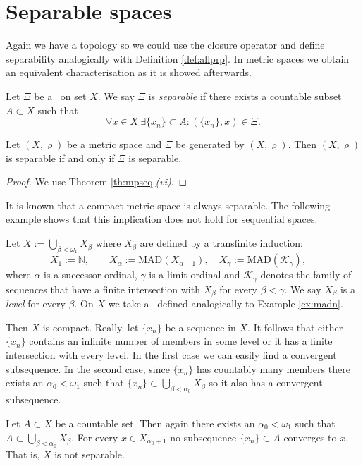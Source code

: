 \section{Separable spaces}

Again we have a topology so we could use the closure operator and define separability analogically with Definition \ref{def:allprp}. In metric spaces we obtain an equivalent characterisation as it is showed afterwards.

\begin{define}\label{def:sep}
Let $\Xi$ be a \fcs\ on set $X$. We say $\Xi$ is \emph{separable} if there exists a countable subset $A\subset X$ such that
\[
	\forall x\in X\ \exists\{x_n\}\subset A: (\{x_n\},x)\in \Xi.
\]
\end{define}

\begin{corollary} \label{th:conneq}
Let $(X,\varrho)$ be a metric space and $\Xi$ be generated by $(X,\varrho)$. Then $(X,\varrho)$ is separable if and only if $\Xi$ is separable.
\end{corollary}
\begin{proof}
We use Theorem \ref{th:mpseq}\emph{(vi)}.
\end{proof}

It is known that a compact metric space is always separable. The following example shows that this implication does not hold for sequential spaces.

\begin{example}\label{ex:madnw1}
Let $X:=\bigcup_{\beta<\omega_1}X_{\beta}$ where $X_\beta$ are defined by a transfinite induction:
\[
	X_1:=\mathbb{N}, \qquad
	X_\alpha:=\mathrm{MAD}(X_{\alpha-1}), \quad
	X_\gamma:=\mathrm{MAD}(\mathcal{K_\gamma}), \quad
\]
where $\alpha$ is a successor ordinal, $\gamma$ is a limit ordinal and $\mathcal{K_\gamma}$ denotes the family of sequences that have a finite intersection with $X_\beta$ for every $\beta<\gamma$. We say $X_\beta$ is a \emph{level} for every $\beta$. On $X$ we take a \fcs\ defined analogically to Example \ref{ex:madn}.

Then $X$ is compact. Really, let $\{x_n\}$ be a sequence in $X$. It follows that either $\{x_n\}$ contains an infinite number of members in some level or it has a finite intersection with every level. In the first case we can easily find a convergent subsequence. In the second case, since $\{x_n\}$ has countably many members there exists an $\alpha_0<\omega_1$ such that $\{x_n\}\subset\bigcup_{\beta<\alpha_0}X_\beta$ so it also has a convergent subsequence.

Let $A\subset X$ be a countable set. Then again there exists an $\alpha_0<\omega_1$ such that $A\subset\bigcup_{\beta<\alpha_0}X_\beta$. For every $x\in X_{\alpha_0+1}$ no subsequence $\{x_n\}\subset A$ converges to $x$. That is, $X$ is not separable.
\end{example}